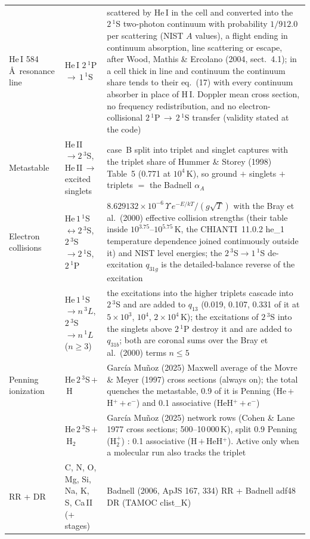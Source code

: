 \documentclass[english,a4paper]{my_memo}
\begin{document}
\begin{longtable}{@{}>{\raggedright\arraybackslash\hyphenpenalty=10000\exhyphenpenalty=10000}p{}p{}p{}@{}}
He\,I 584\,\AA\ resonance line & He\,I $2\,^1$P\,$\to$\,$1\,^1$S & scattered by He\,I in the cell and converted into the $2\,^1$S two-photon continuum with probability $1/912.0$ per scattering (NIST $A$ values), a flight ending in continuum absorption, line scattering or escape, after Wood, Mathis \& Ercolano (2004, sect.~4.1); in a cell thick in line and continuum the continuum share tends to their eq.~(17) with every continuum absorber in place of H\,I. Doppler mean cross section, no frequency redistribution, and no electron-collisional $2\,^1$P\,$\to$\,$2\,^1$S transfer (validity stated at the code) \\
Metastable & He\,II\,$\to2\,^3$S, He\,II\,$\to$\,excited singlets & case~B split into triplet and singlet captures with the triplet share of Hummer \& Storey (1998) Table~5 (0.771 at $10^4$\,K), so ground $+$ singlets $+$ triplets $=$ the Badnell $\alpha_A$ \\
Electron collisions & He\,$1\,^1$S\,$\leftrightarrow2\,^3$S, $2\,^3$S\,$\to2\,^1$S, $2\,^1$P & $8.629132\times10^{-6}\,\Upsilon\,e^{-E/kT}/(g\sqrt{T})$ with the Bray et al.\ (2000) effective collision strengths (their table inside $10^{3.75}$--$10^{5.75}$\,K, the CHIANTI~11.0.2 he\_1 temperature dependence joined continuously outside it) and NIST level energies; the $2\,^3$S$\to1\,^1$S de-excitation $q_{31g}$ is the detailed-balance reverse of the excitation \\
 & He\,$1\,^1$S\,$\to n\,^3L$, $2\,^3$S\,$\to n\,^1L$ ($n\ge3$) & the excitations into the higher triplets cascade into $2\,^3$S and are added to $q_{13}$ (0.019, 0.107, 0.331 of it at $5\times10^3$, $10^4$, $2\times10^4$\,K); the excitations of $2\,^3$S into the singlets above $2\,^1$P destroy it and are added to $q_{31b}$; both are coronal sums over the Bray et al.\ (2000) terms $n\le5$ \\
Penning ionization & He\,$2\,^3$S\,$+$\,H & Garc\'{i}a Mu\~{n}oz (2025) Maxwell average of the Movre \& Meyer (1997) cross sections (always on); the total quenches the metastable, 0.9 of it is Penning (He\,$+$\,H$^+$\,$+\,e^-$) and 0.1 associative (HeH$^+$\,$+\,e^-$) \\
 & He\,$2\,^3$S\,$+$\,H$_2$ & Garc\'{i}a Mu\~{n}oz (2025) network rows (Cohen \& Lane 1977 cross sections; 500--10\,000\,K), split 0.9 Penning (H$_2^+$) : 0.1 associative (H\,$+$\,HeH$^+$). Active only when a molecular run also tracks the triplet \\
RR + DR & C, N, O, Mg, Si, Na, K, S, Ca\,II (+ stages) & Badnell (2006, ApJS 167, 334) RR + Badnell adf48 DR (TAMOC clist\_K) \\

\end{longtable}
\end{document}
